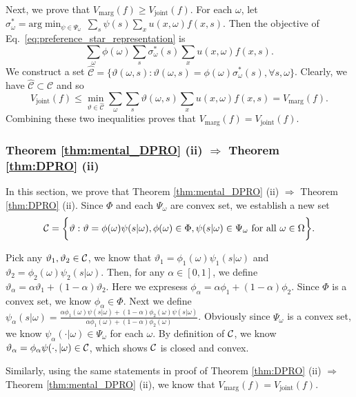 \documentclass[11pt,oneside]{article}
\theoremstyle{plain}
\theoremstyle{plain}
\theoremstyle{plain}
\theoremstyle{plain}
\theoremstyle{plain}
\theoremstyle{definition}
\theoremstyle{definition}
\theoremstyle{remark}
\theoremstyle{plain}
\newcommand{\convmix}[2]{\alpha #1 + (1-\alpha) #2}
\begin{document}
Next, we prove that $V_{\text{marg}}(f) \geq V_{\text{joint}}(f).$
For each $\omega$, let $\sigma_\omega^* = \text{arg} \min_{\psi \in \Psi_{\omega}} \, \sum_s \psi(s) \sum_x u(x,\omega)f(x,s)$. Then the objective of Eq.~\eqref{eq:preference_star_representation} is $$\sum_\omega \phi(\omega)\sum_s \sigma_\omega^*(s)\sum_x u(x,\omega)f(x,s).$$
We construct a set $\hat{\mathcal{C}} = \{ \vartheta(\omega,s):\vartheta(\omega,s) = \phi(\omega)\sigma_\omega^*(s), \forall s,\omega \}$.
Clearly, we have $\hat{\mathcal{C}} \subset \mathcal{C}$ and so
$$
V_\text{joint}(f) \leq \min_{\vartheta \in \hat{\mathcal{C}}} \sum_{\omega}\sum_s \vartheta(\omega,s)\sum_x u(x,\omega)f(x,s) = V_\text{marg}(f).
$$
Combining these two inequalities proves that $V_{\text{marg}}(f) = V_{\text{joint}}(f)$.

\subsubsection{Theorem \ref{thm:mental_DPRO} (ii) $\Rightarrow$ Theorem \ref{thm:DPRO} (ii)}

In this section, we prove that Theorem \ref{thm:mental_DPRO} (ii) $\Rightarrow$ Theorem \ref{thm:DPRO} (ii). Since $\Phi$ and each $\Psi_\omega$ are convex set, we establish a new set
$$
{\cal C} = \bigg\{ \vartheta: \vartheta = \phi(\omega)\psi(s|\omega), \phi(\omega) \in \Phi, \psi(s|\omega) \in \Psi_\omega \text{ for all } \omega \in \Omega \bigg\}.
$$

Pick any $\vartheta_1,\vartheta_2 \in {\cal C}$, we know that $\vartheta_1 = \phi_1(\omega)\psi_1(s|\omega)$ and $\vartheta_2 = \phi_2(\omega)\psi_2(s|\omega)$.
Then, for any $\alpha \in [0,1]$, we define $\vartheta_\alpha = \convmix{\vartheta_1}{\vartheta_2}$. Here we expresess $\phi_\alpha = \alpha \phi_1 + (1-\alpha) \phi_2$. Since $\Phi$ is a
convex set, we know $\phi_\alpha \in \Phi.$ Next we define $\psi_\alpha(s|\omega) = \frac{\convmix{\phi_1(\omega)\psi(s|\omega)}{\phi_2(\omega)\psi(s|\omega)}}{\alpha\phi_1(\omega) + (1-\alpha)\phi_2(\omega)}$. Obviously since 
$\Psi_\omega$ is a convex set, we know $\psi_\alpha(\cdot|\omega) \in \Psi_\omega$ for each $\omega$. By definition of ${\cal C}$, we know $\vartheta_\alpha = \phi_\alpha \psi(\cdot,|\omega) \in {\cal C}$, which shows ${\cal C}$ is closed and convex.

Similarly, using the same statements in proof of Theorem \ref{thm:DPRO} (ii) $\Rightarrow$ Theorem \ref{thm:mental_DPRO} (ii), we know that $V_{\text{marg}}(f) = V_{\text{joint}}(f)$. 
\end{document}

